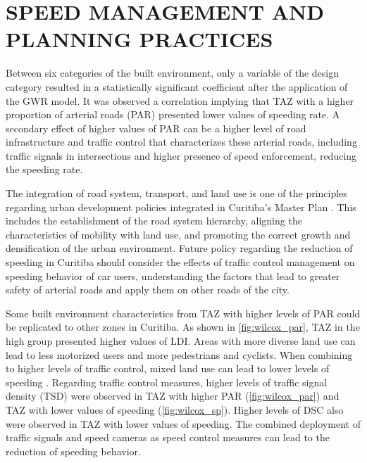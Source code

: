 \section{SPEED MANAGEMENT AND PLANNING PRACTICES} \label{sec:sp_manag}




Between six categories of the built environment, only a variable of the design category resulted in a statistically significant coefficient after the application of the GWR model. It was observed a correlation implying that TAZ with a higher proportion of arterial roads (PAR) presented lower values of speeding rate. A secondary effect of higher values of PAR can be a higher level of road infrastructure and traffic control that characterizes these arterial roads, including traffic signals in intersections and higher presence of speed enforcement, reducing the speeding rate.

The integration of road system, transport, and land use is one of the principles regarding urban development policies integrated in Curitiba's Master Plan \cite{Curitiba2015}. This includes the establishment of the road system hierarchy, aligning the characteristics of mobility with land use, and promoting the correct growth and densification of the urban environment. Future policy regarding the reduction of speeding in Curitiba should consider the effects of traffic control management on speeding behavior of car users, understanding the factors that lead to greater safety of arterial roads and apply them on other roads of the city.

Some built environment characteristics from TAZ with higher levels of PAR could be replicated to other zones in Curitiba. As shown in \autoref{fig:wilcox_par}, TAZ in the high group presented higher values of LDI. Areas with more diverse land use can lead to less motorized users and more pedestrians and cyclists. When combining to higher levels of traffic control, mixed land use can lead to lower levels of speeding \cite{Welle2016}. Regarding traffic control measures, higher levels of traffic signal density (TSD) were observed in TAZ with higher PAR (\autoref{fig:wilcox_par}) and TAZ with lower values of speeding (\autoref{fig:wilcox_sp}). Higher levels of DSC also were observed in TAZ with lower values of speeding. The combined deployment of traffic signals and speed cameras as speed control measures can lead to the reduction of speeding behavior.

